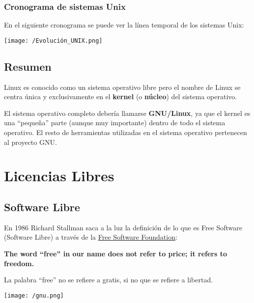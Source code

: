 \subsection{Cronograma de sistemas Unix}
En el siguiente cronograma se puede ver la línea temporal de los sistemas Unix:

\begin{center}
  \texttt{[image: /Evolución\_UNIX.png]}
  \vspace{-10pt}
\end{center}

\section{Resumen}
Linux es conocido como un sistema operativo libre pero el nombre de Linux se  centra única y exclusivamente en el \textbf{kernel} (o \textbf{núcleo}) del sistema operativo.

El sistema operativo completo debería llamarse \textbf{GNU/Linux}, ya que el kernel es una “pequeña” parte (aunque muy importante) dentro de todo el sistema operativo. El resto de herramientas utilizadas en el sistema operativo pertenecen al proyecto GNU.


\chapter{Licencias Libres}
\section{Software Libre}

En 1986 Richard Stallman saca a la luz la definición de lo que es Free Software (Software Libre) a través de la \href{https://es.wikipedia.org/wiki/Free_Software_Foundation}{Free Software Foundation}:

\begin{tcolorbox}[title=Aclarando la palabra “free”:,sidebyside,righthand width=0.12\linewidth]

    \textbf{The word “free” in our name does not refer to price; it refers to freedom.}

    La palabra “free” no se refiere a gratis, si no que se refiere a libertad.

    \tcblower
    \texttt{[image: /gnu.png]}
\end{tcolorbox}


